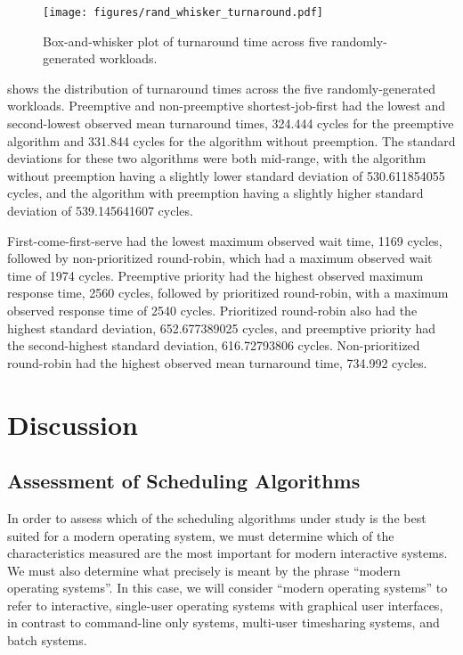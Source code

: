 \documentclass[12pt,letterpaper]{article}
\begin{document}
			\begin{figure}[H]
				\centerline{\texttt{[image: figures/rand\_whisker\_turnaround.pdf]}}
				\caption{Box-and-whisker plot of turnaround time across five randomly-generated workloads.}
				\label{fig:rand_whisker_turn}
			\end{figure}

			 shows the distribution of turnaround times across the five randomly-generated workloads. Preemptive and non-preemptive shortest-job-first had the lowest and second-lowest observed mean turnaround times, 324.444 cycles for the preemptive algorithm and 331.844 cycles for the algorithm without preemption. The standard deviations for these two algorithms were both mid-range, with the algorithm without preemption having a slightly lower standard deviation of 530.611854055 cycles, and the algorithm with preemption having a slightly higher standard deviation of 539.145641607 cycles.

			First-come-first-serve had the lowest maximum observed wait time, 1169 cycles, followed by non-prioritized round-robin, which had a maximum observed wait time of 1974 cycles. Preemptive priority had the highest observed maximum response time, 2560 cycles, followed by prioritized round-robin, with a maximum observed response time of 2540 cycles. Prioritized round-robin also had the highest standard deviation, 652.677389025 cycles, and preemptive priority had the second-highest standard deviation, 616.72793806 cycles. Non-prioritized round-robin had the highest observed mean turnaround time, 734.992 cycles.

  	\section{Discussion}

  		\subsection{Assessment of Scheduling Algorithms}

  			In order to assess which of the scheduling algorithms under study is the best suited for a modern operating system, we must determine which of the characteristics measured are the most important for modern interactive systems. We must also determine what precisely is meant by the phrase ``modern operating systems''. In this case, we will consider ``modern operating systems'' to refer to interactive, single-user operating systems with graphical user interfaces, in contrast to command-line only systems, multi-user timesharing systems, and batch systems.
\end{document}
